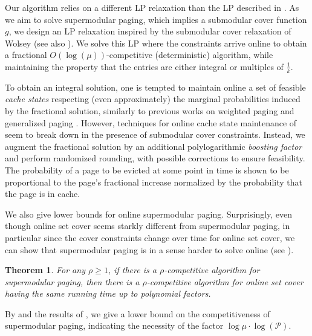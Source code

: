 \documentclass[11pt]{article}
\newcommand{\cP}{{\mathcal{P}}}
\newtheorem{theorem}[thm]{Theorem}
\begin{document}
Our algorithm relies on a different LP relaxation than the LP described in . As we aim to solve supermodular paging, which implies a submodular cover function $g$, we design an LP relaxation inspired by the submodular cover relaxation of Wolsey \cite{wolsey1982analysis} (see also \cite{gupta2020online}). We solve this LP where the constraints arrive online to obtain a fractional $O(\log(\mu))$-competitive (deterministic) algorithm, while maintaining the property that the entries are either integral or multiples of $\frac{1}{k}$. 

To obtain an integral solution, one is tempted to maintain online a set of feasible {\em cache states} respecting (even approximately) the marginal probabilities induced by the fractional solution, similarly to previous works on weighted paging and generalized paging \cite{bansal2012primal,bansal2012randomized,adamaszek2018log}. However, techniques for online cache state maintenance of \cite{bansal2012primal,bansal2012randomized,adamaszek2018log} seem to break down in the presence of submodular cover constraints. Instead, we augment the fractional solution by an additional polylogarithmic {\em boosting factor} and perform randomized rounding, with possible corrections to ensure feasibility. The probability of a page to be evicted at some point in time is shown to be proportional to the page's fractional increase normalized by the probability that the page is in cache. 

We also give lower bounds for online supermodular paging. Surprisingly, even though online set cover seems starkly different from supermodular paging, in particular since the cover constraints change over time for online set cover, we can show that supermodular paging is in a sense harder to solve online (see ).

\begin{theorem}
	\label{lem:Set Cover}
	For any $\rho \geq 1$, if there is a $\rho$-competitive algorithm for \textnormal{supermodular paging}, then there is a $\rho$-competitive algorithm for \textnormal{online set cover} having the same running time up to polynomial factors.  
\end{theorem}


By  and the results of \cite{alon2003online,korman2004use}, we give a lower bound on the competitiveness of supermodular paging, indicating the necessity of the factor $\log \mu \cdot \log \left(\cP\right)$.
\end{document}
